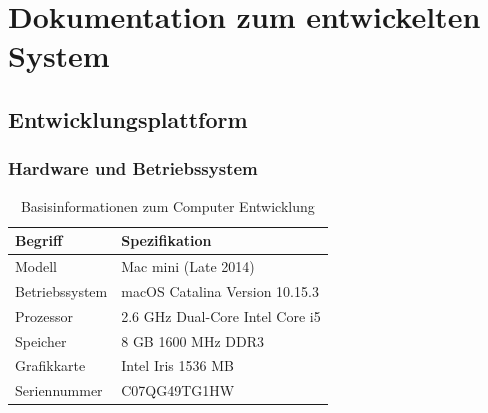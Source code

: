 \section{Dokumentation zum entwickelten System }
\subsection{Entwicklungsplattform}
\subsubsection{Hardware und Betriebssystem}
\begin{table}[H]
	
	\begin{tabular}{p{6cm} p{8cm}}
		
		\toprule[1pt]
		\rowcolor{maroon!30}
		
		Begriff & Spezifikation\\
		
		\midrule 
		Modell & Mac mini (Late 2014) \\
		Betriebssystem & macOS Catalina Version 10.15.3\\
		Prozessor & 2.6 GHz Dual-Core Intel Core i5\\
		Speicher &  8 GB 1600 MHz DDR3\\
		Grafikkarte & Intel Iris 1536 MB\\
		Seriennummer & C07QG49TG1HW\\
		
		\bottomrule
	\end{tabular}
	\caption{Basisinformationen zum Computer Entwicklung}
	\label{fig: Basisinformationen zum Computer Entwicklung}
\end{table}

